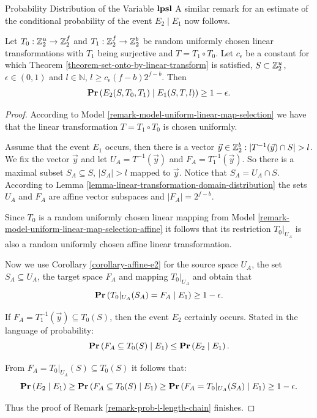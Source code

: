 \begin{section}{Probability Distribution of the Variable \texorpdfstring{$\mathbf{lpsl}$}{lpsl}}
A similar remark for an estimate of the conditional probability of the event $E_2 \mid E_1$ now follows.
\begin{remark}
\label{remark-prob-l-length-chain}
Let $T_0: \mathbb{Z}_{2}^{u} \rightarrow \mathbb{Z}_{2}^{f}$ and $T_1: \mathbb{Z}_{2}^{f} \rightarrow \mathbb{Z}_{2}^{b}$ be random uniformly chosen linear transformations with $T_1$ being surjective and $T = T_1 \circ T_0$. Let $c_\epsilon$ be a constant for which Theorem \ref{theorem-set-onto-by-linear-transform} is satisfied, $S \subset \mathbb{Z}_{2}^{u}$, $\epsilon \in (0, 1)$ and $l \in \mathbb{N}$, $l \geq c_{\epsilon}(f - b)2 ^ {f - b}$. Then
\[
	\mathbf{Pr}\left(E_2(S, T_0, T_1) \mid E_1(S, T, l)\right) \geq 1 - \epsilon \text{.}
\]
\end{remark}
\begin{proof}
According to Model \ref{remark-model-uniform-linear-map-selection} we have that the linear transformation $T = T_1 \circ T_0$ is chosen uniformly.

Assume that the event $E_1$ occurs, then there is a vector $\vec{y} \in \mathbb{Z}_{2}^{b}: |T^{-1}(\vec{y}) \cap S| > l$. We fix the vector $\vec{y}$ and let $U_A = T^{-1}(\vec{y})$ and $F_A = T_1^{-1}(\vec{y})$. So there is a maximal subset $S_A \subseteq S$, $|S_A| > l$ mapped to $\vec{y}$. Notice that $S_A = U_A \cap S$. According to Lemma \ref{lemma-linear-transformation-domain-distribution} the sets $U_A$ and $F_A$ are affine vector subspaces and $|F_A| = 2 ^ {f - b}$.

Since $T_0$ is a random uniformly chosen linear mapping from Model \ref{remark-model-uniform-linear-map-selection-affine} it follows that its restriction $T_0|_{U_A}$ is also a random uniformly chosen affine linear transformation.

Now we use Corollary \ref{corollary-affine-e2} for the source space $U_A$, the set $S_A \subseteq U_A$, the target space $F_A$ and mapping $T_0|_{U_A}$ and obtain that 
\[
	\mathbf{Pr}\left(T_0|_{U_A}(S_A) = F_A \mid E_1\right) \geq 1 - \epsilon \text{.}
\]

If $F_A = T_1^{-1}(\vec{y}) \subseteq T_0(S)$, then the event $E_2$ certainly occurs. Stated in the language of probability:
\[
	\mathbf{Pr}\left(F_A \subseteq T_0(S) \mid E_1\right) \leq \mathbf{Pr}\left(E_2 \mid E_1\right) \text{.}
\]

From $F_A = T_0|_{U_A}(S) \subseteq T_0(S)$ it follows that:
\[
	\mathbf{Pr}\left(E_2 \mid E_1\right) \geq \mathbf{Pr}\left(F_A \subseteq T_0(S) \mid E_1\right) \geq \mathbf{Pr}\left(F_A = T_0|_{U_A}(S_A) \mid E_1\right) \geq 1 - \epsilon \text{.}
\]

Thus the proof of Remark \ref{remark-prob-l-length-chain} finishes.


\end{proof}
\end{section}
